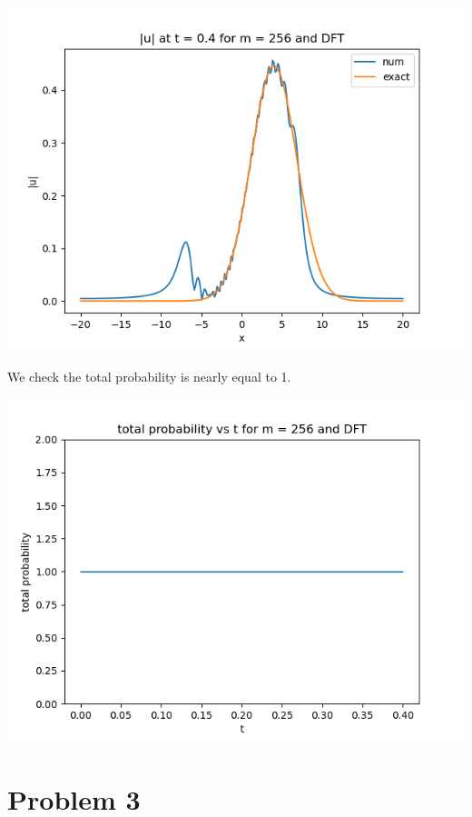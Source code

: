 \documentclass{article}
\begin{document}
\begin{enumerate}[label=(\alph*)]
\begin{center}
	\includegraphics[scale=.3]{FINAL u_abs t = 0.4 m = 256 DFT}
\end{center}
We check the total probability is nearly equal to 1.
\begin{center}
	\includegraphics[scale=.5]{FINAL prob m = 256 DFT}
\end{center}
	
\end{enumerate}


\section*{Problem 3}
\end{document}
